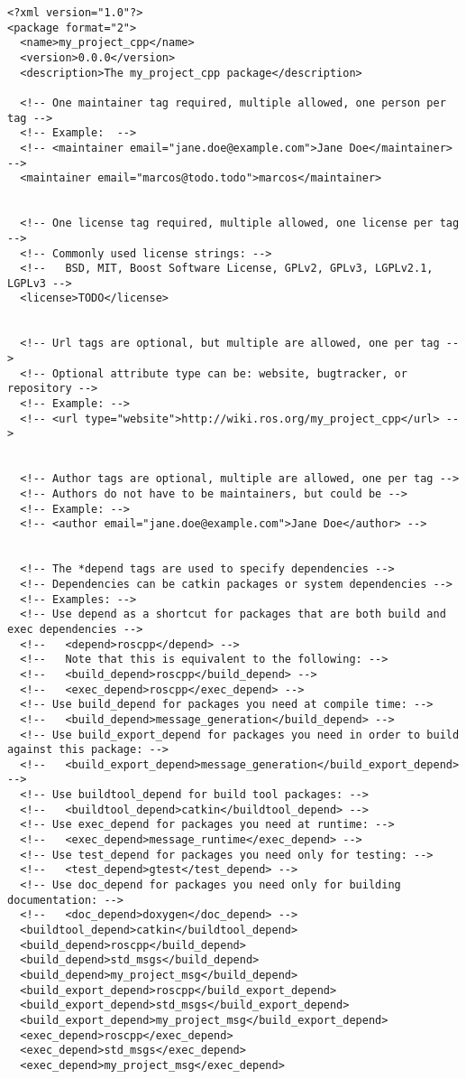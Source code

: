 \documentclass[letterpaper]{article}
\begin{document}
\begin{lstlisting}[style=xmlstyle, title=src/my\_project\_cpp/package.xml] 
<?xml version="1.0"?>
<package format="2">
  <name>my_project_cpp</name>
  <version>0.0.0</version>
  <description>The my_project_cpp package</description>

  <!-- One maintainer tag required, multiple allowed, one person per tag -->
  <!-- Example:  -->
  <!-- <maintainer email="jane.doe@example.com">Jane Doe</maintainer> -->
  <maintainer email="marcos@todo.todo">marcos</maintainer>


  <!-- One license tag required, multiple allowed, one license per tag -->
  <!-- Commonly used license strings: -->
  <!--   BSD, MIT, Boost Software License, GPLv2, GPLv3, LGPLv2.1, LGPLv3 -->
  <license>TODO</license>


  <!-- Url tags are optional, but multiple are allowed, one per tag -->
  <!-- Optional attribute type can be: website, bugtracker, or repository -->
  <!-- Example: -->
  <!-- <url type="website">http://wiki.ros.org/my_project_cpp</url> -->


  <!-- Author tags are optional, multiple are allowed, one per tag -->
  <!-- Authors do not have to be maintainers, but could be -->
  <!-- Example: -->
  <!-- <author email="jane.doe@example.com">Jane Doe</author> -->


  <!-- The *depend tags are used to specify dependencies -->
  <!-- Dependencies can be catkin packages or system dependencies -->
  <!-- Examples: -->
  <!-- Use depend as a shortcut for packages that are both build and exec dependencies -->
  <!--   <depend>roscpp</depend> -->
  <!--   Note that this is equivalent to the following: -->
  <!--   <build_depend>roscpp</build_depend> -->
  <!--   <exec_depend>roscpp</exec_depend> -->
  <!-- Use build_depend for packages you need at compile time: -->
  <!--   <build_depend>message_generation</build_depend> -->
  <!-- Use build_export_depend for packages you need in order to build against this package: -->
  <!--   <build_export_depend>message_generation</build_export_depend> -->
  <!-- Use buildtool_depend for build tool packages: -->
  <!--   <buildtool_depend>catkin</buildtool_depend> -->
  <!-- Use exec_depend for packages you need at runtime: -->
  <!--   <exec_depend>message_runtime</exec_depend> -->
  <!-- Use test_depend for packages you need only for testing: -->
  <!--   <test_depend>gtest</test_depend> -->
  <!-- Use doc_depend for packages you need only for building documentation: -->
  <!--   <doc_depend>doxygen</doc_depend> -->
  <buildtool_depend>catkin</buildtool_depend>
  <build_depend>roscpp</build_depend>
  <build_depend>std_msgs</build_depend>
  <build_depend>my_project_msg</build_depend>
  <build_export_depend>roscpp</build_export_depend>
  <build_export_depend>std_msgs</build_export_depend>
  <build_export_depend>my_project_msg</build_export_depend>
  <exec_depend>roscpp</exec_depend>
  <exec_depend>std_msgs</exec_depend>
  <exec_depend>my_project_msg</exec_depend>



\end{lstlisting}
\end{document}
